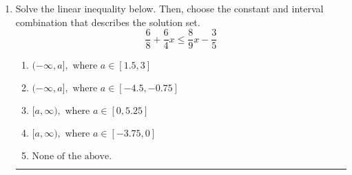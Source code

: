 \documentclass[14pt]{extbook}
\newcommand{\litem}[1]{\item#1\hspace*{-1cm}\rule{\textwidth}{0.4pt}}
\begin{document}
\begin{enumerate}
{\begin{enumerate}[label=\Alph*.]
\end{enumerate} }
\litem{
Solve the linear inequality below. Then, choose the constant and interval combination that describes the solution set.\[ \frac{6}{8} + \frac{6}{4} x \leq \frac{8}{9} x - \frac{3}{5} \]\begin{enumerate}[label=\Alph*.]
\item \( (-\infty, a], \text{ where } a \in [1.5, 3] \)
\item \( (-\infty, a], \text{ where } a \in [-4.5, -0.75] \)
\item \( [a, \infty), \text{ where } a \in [0, 5.25] \)
\item \( [a, \infty), \text{ where } a \in [-3.75, 0] \)
\item \( \text{None of the above}. \)

\end{enumerate} }
\end{enumerate}
\end{document}
